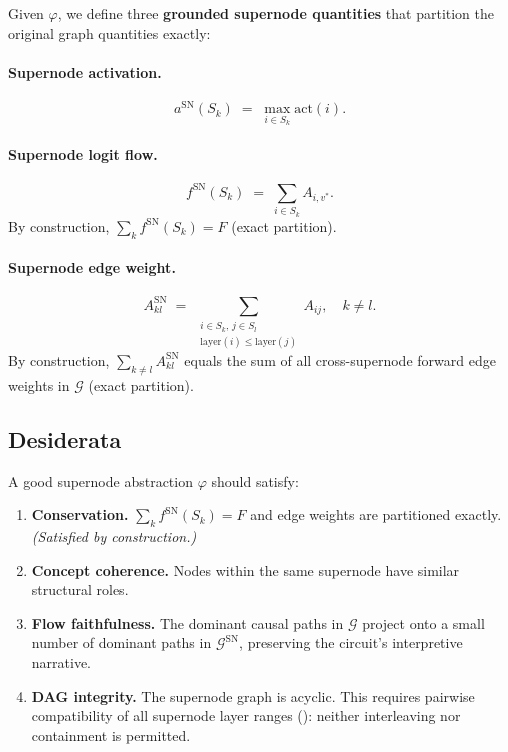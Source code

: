 \documentclass[11pt]{article}
\newcommand{\cG}{\mathcal{G}}
\newcommand{\1}{\mathbbm{1}}
\begin{document}
Given $\varphi$, we define three \textbf{grounded supernode quantities} that partition the original graph quantities exactly:

\paragraph{Supernode activation.}
\[
  a^{\mathrm{SN}}(S_k) \;=\; \max_{i \in S_k} \mathrm{act}(i).
\]

\paragraph{Supernode logit flow.}
\[
  f^{\mathrm{SN}}(S_k) \;=\; \sum_{i \in S_k} A_{i,v^*}.
\]
By construction, $\sum_k f^{\mathrm{SN}}(S_k) = F$ (exact partition).

\paragraph{Supernode edge weight.}
\[
  A^{\mathrm{SN}}_{kl} \;=\; \sum_{\substack{i \in S_k,\, j \in S_l \\ \mathrm{layer}(i) \le \mathrm{layer}(j)}} A_{ij},
  \quad k \ne l.
\]
By construction, $\sum_{k \ne l} A^{\mathrm{SN}}_{kl}$ equals the sum of all cross-supernode forward edge weights in $\cG$ (exact partition).

\subsection{Desiderata}
\label{sec:desiderata}

A good supernode abstraction $\varphi$ should satisfy:
\begin{enumerate}[label=(D\arabic*), leftmargin=3em]
  \item \textbf{Conservation.} $\sum_k f^{\mathrm{SN}}(S_k) = F$ and edge weights are partitioned exactly. \emph{(Satisfied by construction.)}
  \item \textbf{Concept coherence.} Nodes within the same supernode have similar structural roles.
  \item \textbf{Flow faithfulness.} The dominant causal paths in $\cG$ project onto a small number of dominant paths in $\cG^{\mathrm{SN}}$, preserving the circuit's interpretive narrative.
  \item \textbf{DAG integrity.} The supernode graph is acyclic. This requires pairwise compatibility of all supernode layer ranges (): neither interleaving nor containment is permitted.
\end{enumerate}
\end{document}
